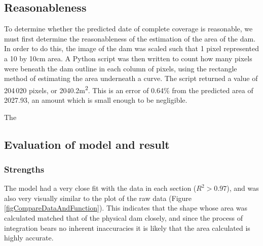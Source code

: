 \documentclass[a4paper]{article}
\theoremstyle{definition}
\begin{document}
    \subsection{Reasonableness}
        To determine whether the predicted date of complete coverage is reasonable, we must first determine the reasonableness of the estimation of the area of the dam. In order to do this, the image of the dam was scaled such that 1 pixel represented a 10 by 10cm area. A Python script was then written to count how many pixels were beneath the dam outline in each column of pixels, using the rectangle method of estimating the area underneath a curve. The script returned a value of 204\,020 pixels, or 2040.2m\textsuperscript{2}. This is an error of 0.64\% from the predicted area of 2027.93, an amount which is small enough to be negligible.

        The 

    \subsection{Evaluation of model and result}

        \subsubsection{Strengths}
            The model had a very close fit with the data in each section ($R^2 > 0.97$), and was also very visually similar to the plot of the raw data (Figure \ref{figCompareDataAndFunction}). This indicates that the shape whose area was calculated matched that of the physical dam closely, and since the process of integration bears no inherent inaccuracies it is likely that the area calculated is highly accurate.
\end{document}
